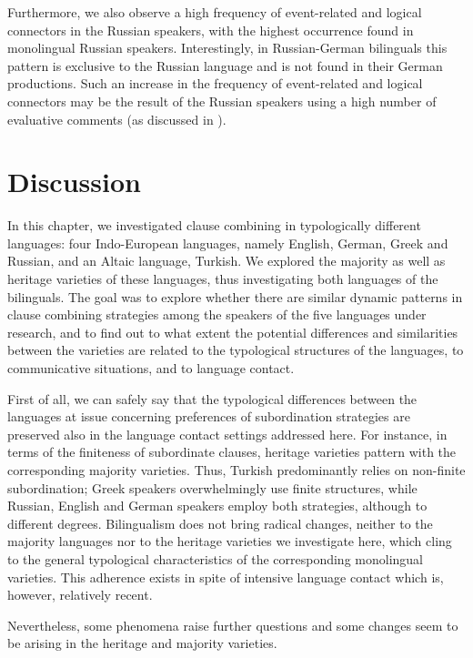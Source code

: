 \documentclass[output=paper,colorlinks,citecolor=brown]{langscibook}
\begin{document}
Furthermore, we also observe a high frequency of event-related and logical connectors in the Russian speakers, with the highest occurrence found in monolingual Russian speakers. Interestingly, in Russian-German bilinguals this pattern is exclusive to the Russian language and is not found in their German productions. Such an increase in the frequency of event-related and logical connectors may be the result of the Russian speakers using a high number of evaluative comments (as discussed in ).

\section{Discussion} \label{sec:schroederetal:4}

In this chapter, we investigated clause combining in typologically different languages: four Indo-European languages, namely English, German, Greek and Russian, and an Altaic language, Turkish. We explored the majority as well as heritage varieties of these languages, thus investigating both languages of the bilinguals. The goal was to explore whether there are similar dynamic patterns in clause combining strategies among the speakers of the five languages under research, and to find out to what extent the potential differences and similarities between the varieties are related to the typological structures of the languages, to communicative situations, and to language contact.   

First of all, we can safely say that the typological differences between the languages at issue concerning preferences of subordination strategies are preserved also in the language contact settings addressed here. For instance, in terms of the finiteness of subordinate clauses, heritage varieties pattern with the corresponding majority varieties. Thus, Turkish predominantly relies on non-finite subordination; Greek speakers overwhelmingly use finite structures, while Russian, English and German speakers employ both strategies, although to different degrees. Bilingualism does not bring radical changes, neither to the majority languages nor to the heritage varieties we investigate here, which cling to the general typological characteristics of the corresponding monolingual varieties. This adherence exists in spite of intensive language contact which is, however, relatively recent.

Nevertheless, some phenomena raise further questions and some changes seem to be arising   in the heritage and majority varieties. 
\end{document}
